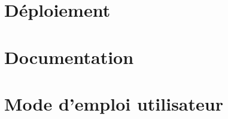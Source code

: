 \documentclass[12pt,a4paper]{report}
\begin{document}

	
	
	
	
	\chapter{Déploiement}
		
		
	\chapter{Documentation}
		
			
			
		
		
			
			
			
				
				
				
			
			
		
			
			
			
			
	\chapter{Mode d'emploi utilisateur}
		
		
		
	
\end{document}
